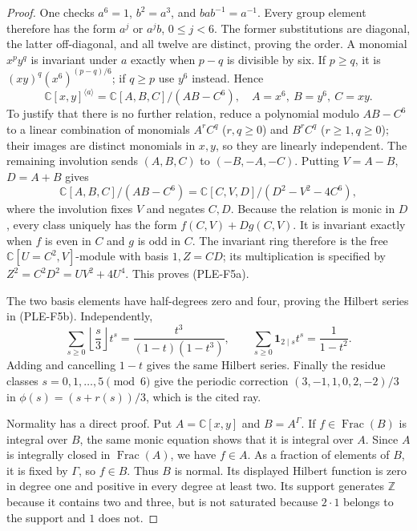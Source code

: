 \begin{proof}
One checks $a^6=1$, $b^2=a^3$, and $bab^{-1}=a^{-1}$.
Every group element therefore has the form $a^j$ or $a^jb$, $0\leq j<6$.
The former substitutions are diagonal, the latter off-diagonal, and all
twelve are distinct, proving the order.
A monomial $x^py^q$ is invariant under $a$ exactly when $p-q$ is divisible
by six. If $p\geq q$, it is $(xy)^q(x^6)^{(p-q)/6}$; if $q\geq p$ use
$y^6$ instead. Hence
\[
 \mathbb C[x,y]^{\langle a\rangle}
   =\mathbb C[A,B,C]/(AB-C^6),
 \quad A=x^6,\ B=y^6,\ C=xy.
\]
To justify that there is no further relation, reduce a polynomial modulo
$AB-C^6$ to a linear combination of monomials $A^rC^q$ ($r,q\geq0$)
and $B^rC^q$ ($r\geq1,q\geq0$); their images are distinct monomials in
$x,y$, so they are linearly independent.
The remaining involution sends $(A,B,C)$ to $(-B,-A,-C)$.
Putting $V=A-B$, $D=A+B$ gives
\[
 \mathbb C[A,B,C]/(AB-C^6)
   =\mathbb C[C,V,D]/(D^2-V^2-4C^6),
\]
where the involution fixes $V$ and negates $C,D$.
Because the relation is monic in $D$, every class uniquely has the form
$f(C,V)+Dg(C,V)$. It is invariant exactly when $f$ is even in $C$ and
$g$ is odd in $C$. The invariant ring therefore is the free
$\mathbb C[U=C^2,V]$-module with basis $1,Z=CD$; its multiplication is
specified by
$Z^2=C^2D^2=UV^2+4U^4$. This proves (PLE-F5a).

The two basis elements have half-degrees zero and four, proving the
Hilbert series in (PLE-F5b). Independently,
\[
 \sum_{s\geq0}\left\lfloor\frac{s}{3}\right\rfloor t^s
       =\frac{t^3}{(1-t)(1-t^3)},\qquad
 \sum_{s\geq0}\mathbf1_{2\mid s}t^s=\frac1{1-t^2}.
\]
Adding and cancelling $1-t$ gives the same Hilbert series. Finally the
residue classes $s=0,1,\ldots,5\pmod6$ give the periodic correction
$(3,-1,1,0,2,-2)/3$ in $\phi(s)=(s+r(s))/3$, which is the cited ray.

Normality has a direct proof. Put $A=\mathbb C[x,y]$ and $B=A^\Gamma$.
If $f\in\operatorname{Frac}(B)$ is integral over $B$, the same monic
equation shows that it is integral over $A$. Since $A$ is integrally
closed in $\operatorname{Frac}(A)$, we have $f\in A$. As a fraction of
elements of $B$, it is fixed by $\Gamma$, so $f\in B$. Thus $B$ is
normal. Its displayed Hilbert function is zero in degree one and positive
in every degree at least two. Its support generates $\mathbb Z$ because
it contains two and three, but is not saturated because $2\cdot1$ belongs
to the support and $1$ does not.
\end{proof}

